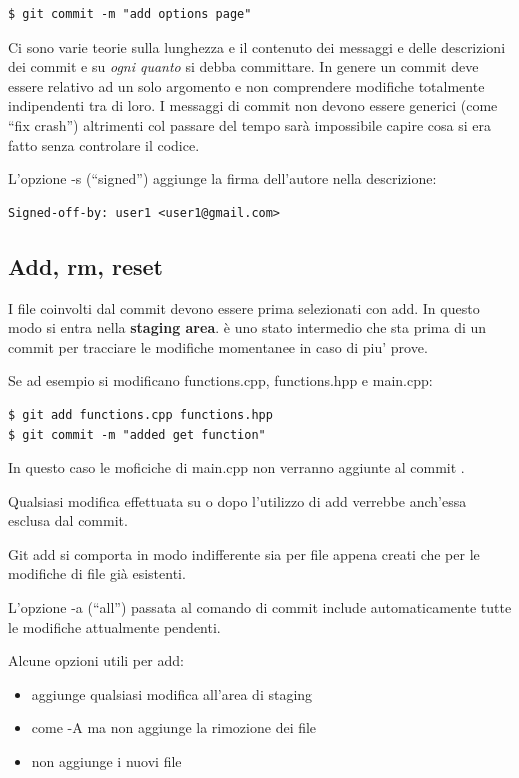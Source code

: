 \documentclass{article} \usepackage[textwidth=18cm,textheight=18cm]{geometry}
\begin{document}
\begin{verbatim}
$ git commit -m "add options page"
\end{verbatim}

Ci sono varie teorie  sulla lunghezza e il contenuto dei messaggi e delle
descrizioni dei commit e su \textit{ogni quanto} si debba committare. In genere un
commit deve essere relativo ad un solo argomento e non comprendere modifiche
totalmente indipendenti tra di loro. I messaggi di commit non devono essere
generici (come ``fix crash'') altrimenti col passare del tempo sarà impossibile
capire cosa si era fatto senza controlare il codice.

L'opzione -s (``signed'') aggiunge la firma dell'autore nella descrizione:

\begin{verbatim}
Signed-off-by: user1 <user1@gmail.com>
\end{verbatim}

\subsection{Add, rm, reset}

I file coinvolti dal commit devono essere prima selezionati con add. In questo
modo si entra nella \textbf{staging area}. è uno stato intermedio che sta prima di
un commit per tracciare le modifiche momentanee in caso di piu' prove.

Se ad esempio si modificano functions.cpp, functions.hpp e main.cpp:

\begin{verbatim}
$ git add functions.cpp functions.hpp
$ git commit -m "added get function"
\end{verbatim}

In questo caso le moficiche di main.cpp non verranno aggiunte al commit .

Qualsiasi modifica effettuata su  o  dopo l'utilizzo
di add verrebbe anch'essa esclusa dal commit.

Git add si comporta in modo indifferente sia per file appena creati che per le
modifiche di file già esistenti.

L'opzione -a (``all'') passata al comando di commit include automaticamente tutte
le modifiche attualmente pendenti.

Alcune opzioni utili per add:

\begin{itemize}
    \item {} aggiunge qualsiasi modifica all'area di staging
    \item {} come -A ma non aggiunge la rimozione dei file
    \item {} non aggiunge i nuovi file
\end{itemize}
\end{document}
